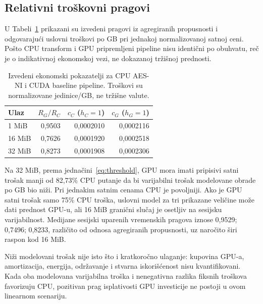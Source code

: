 \documentclass[11pt,b5paper]{article}
\begin{document}
\subsection{Relativni troškovni pragovi}
U Tabeli~\ref{tab:econ} prikazani su izvedeni pragovi iz agregiranih propusnosti i odgovarajući uslovni troškovi po GB pri jednakoj normalizovanoj satnoj ceni. Pošto CPU transform i GPU pripremljeni pipeline nisu identični po obuhvatu, reč je o indikativnoj ekonomskoj vezi, ne dokazanoj tržišnoj prednosti.\par
\begin{table}[htbp]\centering\small
\caption{Izvedeni ekonomski pokazatelji za CPU AES-NI i CUDA baseline pipeline. Troškovi su normalizovane jedinice/GB, ne tržišne valute.}\label{tab:econ}
\begin{tabular}{lrrr}\toprule
Ulaz & $R_G/R_C$ & $c_C$ ($h_C=1$) & $c_G$ ($h_G=1$)\\\midrule
1 MiB & 0,9503 & 0,0002010 & 0,0002116\\
16 MiB & 0,7626 & 0,0001920 & 0,0002518\\
32 MiB & 0,8273 & 0,0001908 & 0,0002306\\\bottomrule
\end{tabular}
\end{table}
Na 32 MiB, prema jednačini~\eqref{eq:threshold}, GPU mora imati pripisivi satni trošak manji od 82,73\% CPU putanje da bi varijabilni trošak modelovane obrade po GB bio niži. Pri jednakim satnim cenama CPU je povoljniji. Ako je GPU satni trošak samo 75\% CPU troška, uslovni model za tri prikazane veličine može dati prednost GPU-u, ali 16 MiB granični slučaj je osetljiv na sesijsku varijabilnost. Medijane sesijski uparenih vremenskih pragova iznose 0,9529; 0,7496; 0,8233, različito od odnosa agregiranih propusnosti, uz naročito širi raspon kod 16 MiB.\par
Niži modelovani trošak nije isto što i kratkoročno ulaganje: kupovina GPU-a, amortizacija, energija, održavanje i stvarna iskorišćenost nisu kvantifikovani. Kada oba modelovana varijabilna troška i nenegativna razlika fiksnih troškova favorizuju CPU, pozitivan prag isplativosti GPU investicije ne postoji u ovom linearnom scenariju.
\end{document}
